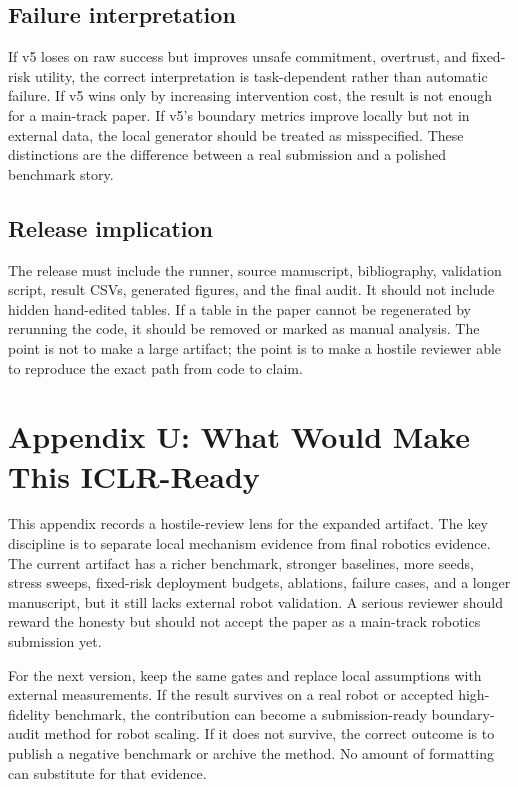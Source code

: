 \documentclass{article}
\begin{document}
\subsection{Failure interpretation}
If v5 loses on raw success but improves unsafe commitment, overtrust, and fixed-risk utility, the correct interpretation is task-dependent rather than automatic failure. If v5 wins only by increasing intervention cost, the result is not enough for a main-track paper. If v5's boundary metrics improve locally but not in external data, the local generator should be treated as misspecified. These distinctions are the difference between a real submission and a polished benchmark story.

\subsection{Release implication}
The release must include the runner, source manuscript, bibliography, validation script, result CSVs, generated figures, and the final audit. It should not include hidden hand-edited tables. If a table in the paper cannot be regenerated by rerunning the code, it should be removed or marked as manual analysis. The point is not to make a large artifact; the point is to make a hostile reviewer able to reproduce the exact path from code to claim.


\section{Appendix U: What Would Make This ICLR-Ready}
This appendix records a hostile-review lens for the expanded artifact. The key discipline is to separate local mechanism evidence from final robotics evidence. The current artifact has a richer benchmark, stronger baselines, more seeds, stress sweeps, fixed-risk deployment budgets, ablations, failure cases, and a longer manuscript, but it still lacks external robot validation. A serious reviewer should reward the honesty but should not accept the paper as a main-track robotics submission yet.

For the next version, keep the same gates and replace local assumptions with external measurements. If the result survives on a real robot or accepted high-fidelity benchmark, the contribution can become a submission-ready boundary-audit method for robot scaling. If it does not survive, the correct outcome is to publish a negative benchmark or archive the method. No amount of formatting can substitute for that evidence.
\end{document}
